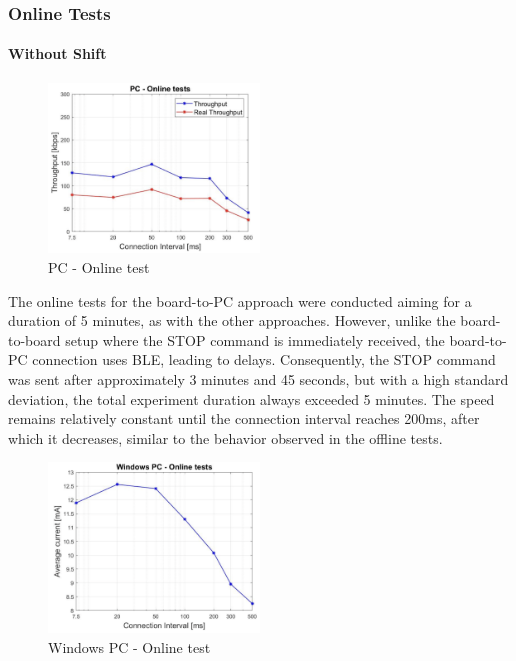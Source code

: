 \documentclass{Configuration_Files/PoliMi3i_thesis}
\begin{document}
\subsubsection*{Online Tests}

\paragraph{Without Shift}

\begin{figure}[H]
    \centering
    \includegraphics[width=0.5\textwidth]{Results Manuel/figure35}
    \caption{PC - Online test}
    \label{manuel_results_35}
\end{figure}

The online tests for the board-to-PC approach were conducted aiming for a duration of 5 minutes, as with the other approaches. However, unlike the board-to-board setup where the STOP command is immediately received, the board-to-PC connection uses BLE, leading to delays. Consequently, the STOP command was sent after approximately 3 minutes and 45 seconds, but with a high standard deviation, the total experiment duration always exceeded 5 minutes. The speed remains relatively constant until the connection interval reaches 200ms, after which it decreases, similar to the behavior observed in the offline tests.

\begin{figure}[H]
    \centering
    \includegraphics[width=0.5\textwidth]{Results Manuel/figure36}
    \caption{Windows PC - Online test}
    \label{manuel_results_36}
\end{figure}
\end{document}
